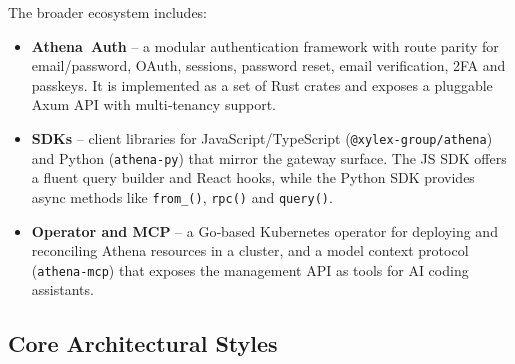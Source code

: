 \documentclass[11pt,a4paper]{article}
\begin{document}
The broader ecosystem includes:
\begin{itemize}
  \item \textbf{Athena Auth} – a modular authentication framework with route parity for email/password, OAuth, sessions, password reset, email verification, 2FA and passkeys.  It is implemented as a set of Rust crates and exposes a pluggable Axum API with multi‑tenancy support.
  \item \textbf{SDKs} – client libraries for JavaScript/TypeScript (\texttt{@xylex-group/athena}) and Python (\texttt{athena-py}) that mirror the gateway surface.  The JS SDK offers a fluent query builder and React hooks, while the Python SDK provides async methods like \texttt{from\_()}, \texttt{rpc()} and \texttt{query()}.
  \item \textbf{Operator and MCP} – a Go‑based Kubernetes operator for deploying and reconciling Athena resources in a cluster, and a model context protocol (\texttt{athena-mcp}) that exposes the management API as tools for AI coding assistants.
\end{itemize}

\subsection{Core Architectural Styles}
\end{document}
